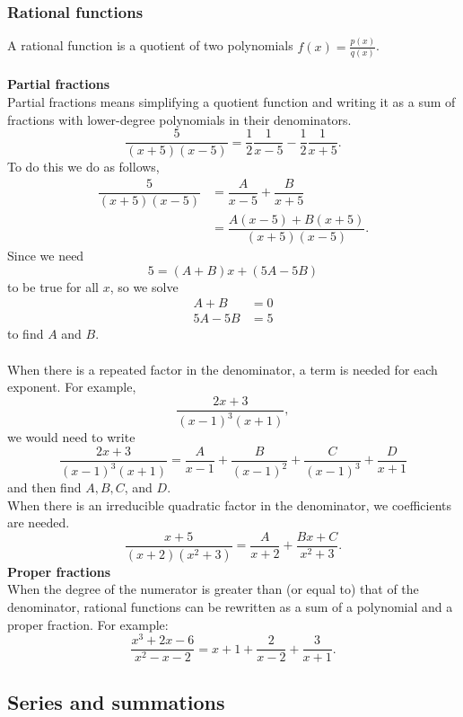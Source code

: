 \documentclass[10pt, a4paper]{article}
\begin{document}
\subsubsection{Rational functions}
A rational function is a quotient of two polynomials $f(x) = \frac{p(x)}{q(x)}$. \\
\\
\textbf{Partial fractions} \\
Partial fractions means simplifying a quotient function and writing it as a sum of fractions with lower-degree polynomials in their denominators.
\[
\dfrac{5}{(x + 5)(x - 5)} = \dfrac{1}{2}\dfrac{1}{x - 5} - \dfrac{1}{2}\dfrac{1}{x + 5}.
\]
To do this we do as follows,
\begin{align*}
\dfrac{5}{(x + 5)(x - 5)} &= \dfrac{A}{x - 5} + \dfrac{B}{x + 5} \\
&= \dfrac{A(x - 5) + B(x + 5)}{(x + 5)(x - 5)}.
\end{align*}
Since we need
\[
5 = (A + B)x + (5A - 5B)
\]
to be true for all $x$, so we solve
\begin{align*}
    A + B &= 0 \\
    5A - 5B &= 5
\end{align*}
to find $A$ and $B$. \\
\\
When there is a repeated factor in the denominator, a term is needed for each exponent. For example,
\[
\dfrac{2x + 3}{(x - 1) ^ 3 (x + 1)},
\]
we would need to write
\[
\dfrac{2x + 3}{(x - 1) ^ 3 (x + 1)} = \dfrac{A}{x - 1} + \dfrac{B}{(x - 1) ^ 2} + \dfrac{C}{(x - 1) ^ 3} + \dfrac{D}{x +1}
\]
and then find $A, B, C$, and $D$. \\
When there is an irreducible quadratic factor in the denominator, we coefficients are needed.
\[
\dfrac{x + 5}{(x + 2)(x ^ 2 + 3)} = \dfrac{A}{x + 2} + \dfrac{Bx + C}{x ^ 2 + 3}.
\]
\textbf{Proper fractions} \\
When the degree of the numerator is greater than (or equal to) that of the denominator, rational functions can be rewritten as a sum of a polynomial and a proper fraction. For example:
\[
\dfrac{x ^ 3 + 2x - 6}{x ^ 2 - x - 2} = x + 1 + \dfrac{2}{x - 2} + \dfrac{3}{x + 1}.
\]


\subsection{Series and summations}
\end{document}
